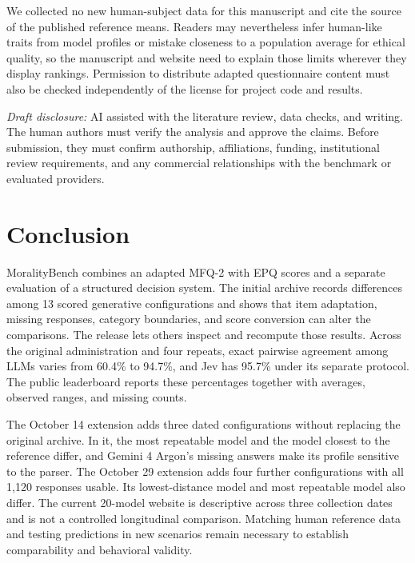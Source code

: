 \documentclass[11pt]{article}
\begin{document}
We collected no new human-subject data for this manuscript and cite the source of the published reference means. Readers may nevertheless infer human-like traits from model profiles or mistake closeness to a population average for ethical quality, so the manuscript and website need to explain those limits wherever they display rankings. Permission to distribute adapted questionnaire content must also be checked independently of the license for project code and results.

\emph{Draft disclosure:} AI assisted with the literature review, data checks, and writing. The human authors must verify the analysis and approve the claims. Before submission, they must confirm authorship, affiliations, funding, institutional review requirements, and any commercial relationships with the benchmark or evaluated providers.

\section{Conclusion}
MoralityBench combines an adapted MFQ-2 with EPQ scores and a separate evaluation of a structured decision system. The initial archive records differences among 13 scored generative configurations and shows that item adaptation, missing responses, category boundaries, and score conversion can alter the comparisons. The release lets others inspect and recompute those results. Across the original administration and four repeats, exact pairwise agreement among LLMs varies from 60.4\% to 94.7\%, and Jev has 95.7\% under its separate protocol. The public leaderboard reports these percentages together with averages, observed ranges, and missing counts.

The October 14 extension adds three dated configurations without replacing the original archive. In it, the most repeatable model and the model closest to the reference differ, and Gemini 4 Argon's missing answers make its profile sensitive to the parser. The October 29 extension adds four further configurations with all 1,120 responses usable. Its lowest-distance model and most repeatable model also differ. The current 20-model website is descriptive across three collection dates and is not a controlled longitudinal comparison. Matching human reference data and testing predictions in new scenarios remain necessary to establish comparability and behavioral validity.
\end{document}
